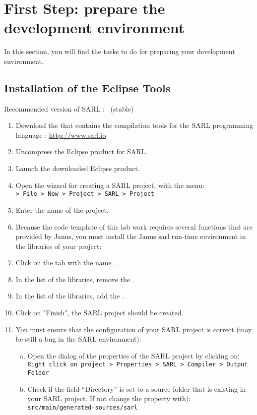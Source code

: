 \section{First Step: prepare the development environment}

In this section, you will find the tasks to do for preparing your development environment.

\subsection{Installation of the Eclipse Tools}

\begin{emphbox}
Recommended version of SARL : \sarlversion\ (stable)
\end{emphbox}

\begin{enumerate}
\item Download the  that contains the compilation tools for the SARL programming language : \url{http://www.sarl.io}
\item Uncompress the Eclipse product for SARL.
\item Launch the downloaded Eclipse product.
\item Open the wizard for creating a SARL project, with the menu: \\
	\texttt{> File > New > Project > SARL > Project}
\item Enter the name of the project.
\ifJANUSINCLASSPATH
\item Because the code template of this lab work requires several functions that are provided by Janus, you must install the Janus sarl run-time environment in the libraries of your project:
	\item Click on the tab with the name .
	\item In the list of the libraries, remove the .
	\item In the list of the libraries, add the .
\fi
\item Click on "Finish", the SARL project should be created.
\item You must ensure that the configuration of your SARL project is correct (may be still a bug in the SARL environment):
	\begin{enumerate}[a)]
	\item Open the dialog of the properties of the SARL project by clicking on: \\
		\texttt{Right click on project > Properties > SARL > Compiler > Output Folder}
	\item Check if the field ``Directory'' is set to a source folder that is existing in your SARL project. If not change the property with): \\
		\texttt{src/main/generated-sources/sarl}
	\end{enumerate}
\end{enumerate}

